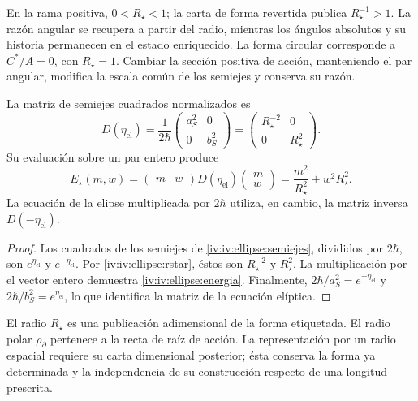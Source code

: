En la rama positiva, \(0<R_\star<1\); la carta de forma
revertida publica \(R_\star^{-1}>1\). La razón angular
se recupera a partir del radio, mientras los ángulos absolutos
y su historia permanecen en el estado enriquecido.
La forma circular corresponde a \(C^*/A=0\), con
\(R_\star=1\). Cambiar la sección positiva de acción,
manteniendo el par angular, modifica la escala común de
los semiejes y conserva su razón.

\begin{proposition}
\label{iv:iv:ellipse:matriz-prop}
La matriz de semiejes cuadrados normalizados es
\begin{equation}
 D(\eta_{\mathrm{el}})
 =\frac1{2\hbar}
    \begin{pmatrix}a_S^2&0\\0&b_S^2\end{pmatrix}
 =\begin{pmatrix}R_\star^{-2}&0\\0&R_\star^2\end{pmatrix}.
 \label{iv:iv:ellipse:matriz}
\end{equation}
Su evaluación sobre un par entero produce
\begin{equation}
 E_\star(m,w)=
 \begin{pmatrix}m&w\end{pmatrix}
 D(\eta_{\mathrm{el}})
 \begin{pmatrix}m\\w\end{pmatrix}
 =\frac{m^2}{R_\star^2}+w^2R_\star^2.
 \label{iv:iv:ellipse:energia}
\end{equation}
La ecuación de la elipse multiplicada por \(2\hbar\)
utiliza, en cambio, la matriz inversa \(D(-\eta_{\mathrm{el}})\).
\end{proposition}
\begin{proof}
Los cuadrados de los semiejes de
\eqref{iv:iv:ellipse:semiejes}, divididos por \(2\hbar\),
son \(e^{\eta_{\mathrm{el}}}\) y
\(e^{-\eta_{\mathrm{el}}}\).
Por \eqref{iv:iv:ellipse:rstar}, éstos son
\(R_\star^{-2}\) y \(R_\star^2\).
La multiplicación por el vector entero demuestra
\eqref{iv:iv:ellipse:energia}. Finalmente,
\(2\hbar/a_S^2=e^{-\eta_{\mathrm{el}}}\) y
\(2\hbar/b_S^2=e^{\eta_{\mathrm{el}}}\), lo que
identifica la matriz de la ecuación elíptica.
\end{proof}

El radio \(R_\star\) es una publicación adimensional de
la forma etiquetada. El radio polar
\(\rho_{\partial}\) pertenece a la recta de raíz de acción.
La representación por un radio espacial requiere su carta
dimensional posterior; ésta conserva la forma ya determinada
y la independencia de su construcción respecto de una
longitud prescrita.
